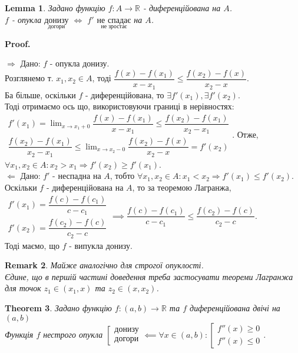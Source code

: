 \documentclass[a4paper, 14pt]{article}
\makeatletter
\def\qed{$\blacksquare$}
\def\rightproof{$\boxed{\Rightarrow}$ }
\def\leftproof{$\boxed{\Leftarrow}$ }
\theoremstyle{theoremdd}
\newtheorem{theorem}{Theorem}[subsection]
\theoremstyle{theoremdd}
\theoremstyle{theoremdd}
\theoremstyle{theoremdd}
\theoremstyle{theoremdd}
\theoremstyle{theoremdd}
\newtheorem{remark}[theorem]{Remark}
\theoremstyle{theoremdd}
\newtheorem{lemma}[theorem]{Lemma}
\theoremstyle{theoremdd}
\renewenvironment{proof}[1][Proof.\\]{\par
\pushQED{\hfill \qed}%
\normalfont \topsep6\p@\@plus6\p@\relax
\trivlist
\item\relax
{\bfseries
#1\@addpunct{.}}\hspace\labelsep\ignorespaces
}{%
\popQED\endtrivlist\@endpefalse
}
\makeatother
\begin{document}
\begin{lemma}
Задано функцію $f: A \to \mathbb{R}$ - диференційована на $A$.\\
$f$ - опукла $\underset{\textrm{догори}}{\textrm{донизу}}$ $\iff$ $f'$ $\underset{\textrm{не зростає}}{\textrm{не спадає}}$ на $A$.
\end{lemma}

\begin{proof}
\rightproof Дано: $f$ - опукла донизу.\\
Розглянемо т. $x_1, x_2 \in A$, тоді $\dfrac{f(x)-f(x_1)}{x-x_1} \leq \dfrac{f(x_2)-f(x)}{x_2-x}$.\\
Ба більше, оскільки $f$ - диференційована, то $\exists f'(x_1), \exists f'(x_2)$.\\
Тоді отримаємо ось що, використовуючи границі в нерівностях:\\
$\left. \begin{gathered}
f'(x_1) = \displaystyle \lim_{x \to x_1+0} \dfrac{f(x)-f(x_1)}{x-x_1} \leq \dfrac{f(x_2)-f(x_1)}{x_2-x_1} \\
\dfrac{f(x_2)-f(x_1)}{x_2-x_1} \leq \displaystyle \lim_{x \to x_2-0} \dfrac{f(x_2)-f(x)}{x_2-x} = f'(x_2)
\end{gathered} \right.$. Отже, $\forall x_1,x_2 \in A: x_2 > x_1 \Rightarrow f'(x_2) \geq f'(x_1)$.
\bigskip \\
\leftproof Дано: $f'$ - неспадна на $A$, тобто $\forall x_1,x_2 \in A: x_1 < x_2 \Rightarrow f'(x_1) \leq f'(x_2)$.\\
Оскільки $f$ - диференційована на $A$, то за теоремою Лагранжа,\\
$\begin{gathered}
f'(x_1) = \dfrac{f(c) - f(c_1)}{c- c_1}\\
f'(x_2) = \dfrac{f(c_2) - f(c)}{c_2 - c}
\end{gathered} \implies \dfrac{f(c) - f(c_1)}{c- c_1} \leq \dfrac{f(c_2) - f(c)}{c_2 - c}$.\\
Тоді маємо, що $f$ - випукла донизу.
\end{proof}

\begin{remark}
Майже аналогічно для строгої опуклості.\\
Єдине, що в першій частині доведення треба застосувати теореми Лагранжа для точок $z_1 \in (x_1,x)$ та $z_2 \in (x,x_2)$.
\end{remark}

\begin{theorem}
Задано функцію $f: (a,b) \to \mathbb{R}$ та $f$ диференційована двічі на $(a,b)$\\
Функція $f$ нестрого опукла $\left[ \begin{gathered} \textrm{донизу} \\ \textrm{догори} \end{gathered} \right. \impliedby \forall x \in (a,b): \left[ \begin{gathered} f''(x) \geq 0 \\ f''(x) \leq 0 \end{gathered} \right.$.
\end{theorem}
\end{document}
